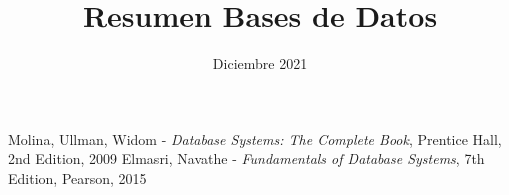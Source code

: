 \documentclass[a4paper,12pt]{report}
\begin{document}
\title{Resumen Bases de Datos}
\date{Diciembre 2021}

\maketitle
\tableofcontents






\begin{thebibliography}{9}
	 Molina, Ullman, Widom - \emph{Database Systems: The Complete Book}, Prentice Hall, 2nd Edition, 2009
	 Elmasri, Navathe - \emph{Fundamentals of Database Systems}, 7th Edition, Pearson, 2015
\end{thebibliography}
\end{document}
